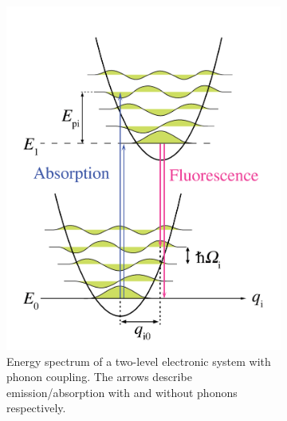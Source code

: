 \begin{figure}[H]
	\centering
	\begin{subfigure}[b]{0.48\textwidth}
		\centering
		\includegraphics[width=\textwidth]{figures/quantum-dot/Phonon-energy-diagram}
		\caption{Energy spectrum of a two-level electronic system with phonon coupling.
			The arrows describe emission/absorption with and without phonons respectively.~\cite{noauthor_zero-phonon_nodate}}
		\label{fig:phonon-energy-diagram}
	\end{subfigure}%
	~ %
	\begin{subfigure}[b]{0.48\textwidth}
		\centering

\end{subfigure}
\end{figure}
